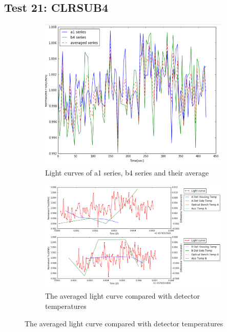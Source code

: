 \documentclass{aastex6}
\begin{document}
\subsection{Test 21: CLRSUB4} 
\begin{figure}[H]
    \centering
    \begin{subfigure}{1}
        \includegraphics[scale=0.4]{ts_test21}
        \caption{Light curves of a1 series, b4 series and their average}
    \end{subfigure}

    \begin{subfigure}{2}
        \includegraphics[scale=0.4]{temp_test21}
        \caption{The averaged light curve compared with detector temperatures}
    \end{subfigure}
   

\end{figure}
\end{document}
